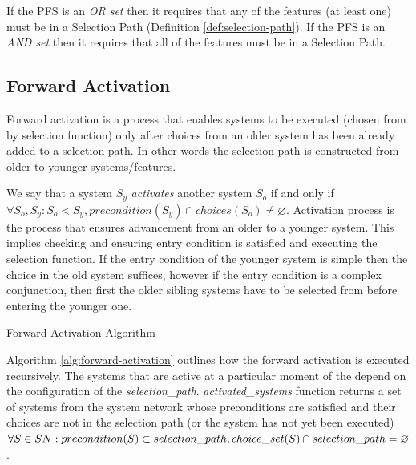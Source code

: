 If the PFS is an \textit{OR set} then it requires that any of the features (at least one) must be in a Selection Path (Definition \ref{def:selection-path}). If the PFS is an \textit{AND set} then it requires that all of the features must be in a Selection Path.


\subsection{Forward Activation}
Forward activation is a process that enables systems to be executed (chosen from by selection function) only after choices from an older system has been already added to a selection path. In other words the selection path is constructed from older to younger systems/features.

We say that a system $S_y$ \textit{activates} another system $S_o$ if and only if\\ ${\forall S_o, S_y: S_o < S_y, precondition(S_y) \cap choices(S_o) \neq \varnothing}$. Activation process is the process that ensures advancement from an older to a younger system. This implies checking and ensuring entry condition is satisfied and executing the selection function. If the entry condition of the younger system is simple then the choice in the old system suffices, however if the entry condition is a complex conjunction, then first the older sibling systems have to be selected from before entering the younger one. 



\begin{algorithm}
\caption{Forward Activation Algorithm}
\label{alg:forward-activation}
\end{algorithm}

Algorithm \ref{alg:forward-activation} outlines how the forward activation is executed recursively. The systems that are active at a particular moment of the depend on the configuration of the \textit{selection\_path}. \textit{activated\_systems} function returns a set of systems from the system network whose preconditions are satisfied and their choices are not in the selection path (or the system has not yet been executed) $\forall S \in SN : precondition(S) \subset selection\_path,\\ choice\_set(S) \cap selection\_path = \varnothing$.

